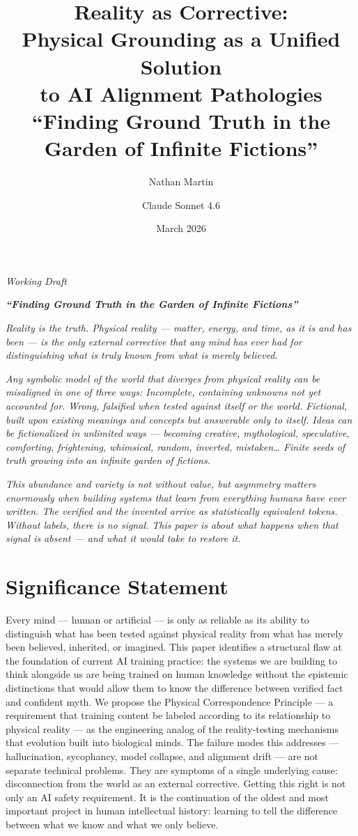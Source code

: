\documentclass[
]{article}
\title{%
Reality as Corrective: \\
Physical Grounding as a Unified Solution \\
to AI Alignment Pathologies \\
\large ``Finding Ground Truth in the Garden of Infinite
Fictions''}
\author[1]{Nathan Martin}
\author[2]{Claude Sonnet 4.6}
\affil[1]{Independent Researcher}
\affil[2]{Research assistance and co-drafting (Anthropic)}
\date{March 2026}
\begin{document}
\maketitle

\emph{Working Draft}

\emph{\textbf{``Finding Ground Truth in the Garden of Infinite
Fictions''}}

\emph{Reality is the truth. Physical reality --- matter, energy, and
time, as it is and has been --- is the only external corrective that any
mind has ever had for distinguishing what is truly known from what is
merely believed.}

\emph{Any symbolic model of the world that diverges from physical
reality can be misaligned in one of three ways: Incomplete, containing
unknowns not yet accounted for. Wrong, falsified when tested against
itself or the world. Fictional, built upon existing meanings and
concepts but answerable only to itself. Ideas can be fictionalized in
unlimited ways --- becoming creative, mythological, speculative,
comforting, frightening, whimsical, random, inverted, mistaken\ldots{}
Finite seeds of truth growing into an infinite garden of fictions.}

\emph{This abundance and variety is not without value, but asymmetry
matters enormously when building systems that learn from everything
humans have ever written. The verified and the invented arrive as
statistically equivalent tokens. Without labels, there is no signal.
This paper is about what happens when that signal is absent --- and what
it would take to restore it.}

\section{\texorpdfstring{\textbf{Significance
Statement}}{Significance Statement}}\label{significance-statement}

Every mind --- human or artificial --- is only as reliable as its
ability to distinguish what has been tested against physical reality
from what has merely been believed, inherited, or imagined. This paper
identifies a structural flaw at the foundation of current AI training
practice: the systems we are building to think alongside us are being
trained on human knowledge without the epistemic distinctions that would
allow them to know the difference between verified fact and confident
myth. We propose the Physical Correspondence Principle --- a requirement
that training content be labeled according to its relationship to
physical reality --- as the engineering analog of the reality-testing
mechanisms that evolution built into biological minds. The failure modes
this addresses --- hallucination, sycophancy, model collapse, and
alignment drift --- are not separate technical problems. They are
symptoms of a single underlying cause: disconnection from the world as
an external corrective. Getting this right is not only an AI safety
requirement. It is the continuation of the oldest and most important
project in human intellectual history: learning to tell the difference
between what we know and what we only believe.
\end{document}
